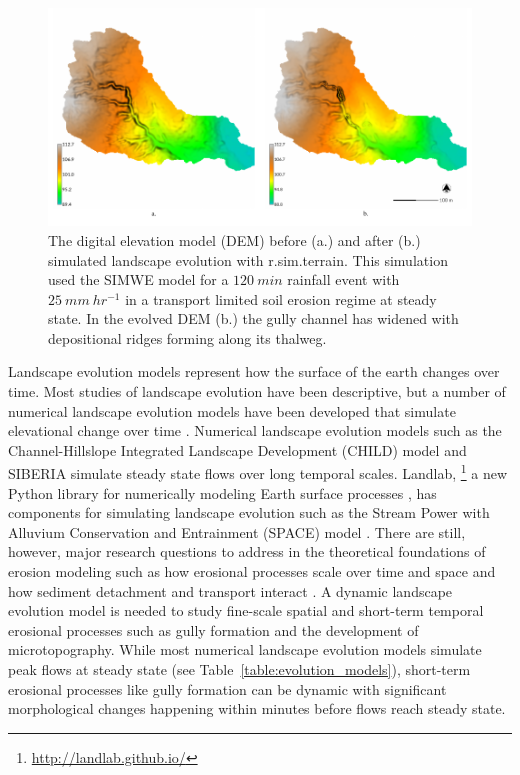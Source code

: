 \documentclass[esurf, manuscript]{copernicus}
\begin{document}

\begin{figure}%
\center
\includegraphics[width=\textwidth,height=0.925\textheight,keepaspectratio]{figures/evolution.pdf}
\caption{
The digital elevation model (DEM) 
before (a.) and after (b.)
simulated landscape evolution with
\lowercase{r.sim.terrain}. 
This simulation used the SIMWE model
for a $120~min$ rainfall event with $25~mm~hr^{-1}$
in a transport limited soil erosion regime at steady state.
In the evolved DEM (b.)
the gully channel has widened 
with depositional ridges forming along its thalweg.}
\label{fig:evolution}
\end{figure}


\introduction  %
Landscape evolution models represent how the surface of the earth changes over time. 
Most studies of landscape evolution have been descriptive, 
but a number of numerical landscape evolution models 
have been developed that simulate elevational change over time 
\citep{Temme2013}. 
Numerical landscape evolution models
such as the Channel-Hillslope Integrated Landscape Development (CHILD) model 
\citep{Tucker2001} 
and SIBERIA \citep{Willgoose2005}
simulate steady state flows over long temporal scales. 
Landlab,
\footnote{\url{http://landlab.github.io/}}
a new Python library for numerically modeling Earth surface processes
\citep{Hobley2017},
has components for simulating landscape evolution such as the 
Stream Power with Alluvium Conservation and Entrainment (SPACE) 
model \citep{Shobe2017}.
There are still, however, major research questions 
to address in the theoretical foundations of erosion modeling 
such as how erosional processes scale over time and space 
and how sediment detachment and transport interact \citep{Mitasova2013}. 
A dynamic landscape evolution model is needed to study
fine-scale spatial and short-term temporal erosional processes
such as gully formation and the development of microtopography. 
While most numerical landscape evolution models 
simulate peak flows at steady state
(see Table~\ref{table:evolution_models}),
short-term erosional processes like gully formation can be dynamic
with significant morphological changes happening within minutes
before flows reach steady state. 
\end{document}
